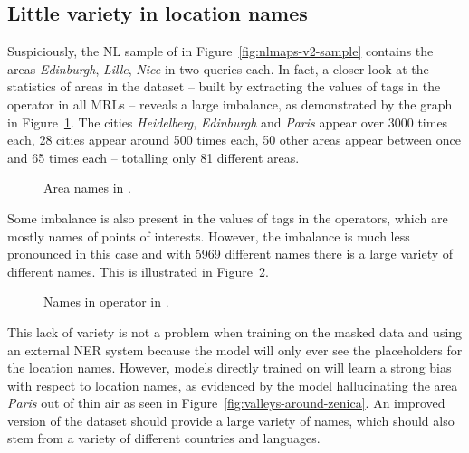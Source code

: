 \subsection{Little variety in location names}
\label{sec:little-location-variety}

Suspiciously, the NL sample of \nlmapstwo{} in Figure~\ref{fig:nlmaps-v2-sample}
contains the areas \emph{Edinburgh}, \emph{Lille}, \emph{Nice} in two queries
each. In fact, a closer look at the statistics of areas in the dataset – built
by extracting the values of  tags in the  operator in
all \nlmapstwo{} MRLs – reveals a large imbalance, as demonstrated by the graph
in Figure~\ref{fig:nlmaps-v2-areas}. The cities \emph{Heidelberg},
\emph{Edinburgh} and \emph{Paris} appear over \num{3000} times each, \num{28}
cities appear around \num{500} times each, \num{50} other areas appear between
once and \num{65} times each – totalling only \num{81} different areas.

\begin{figure}[h]
  \centering
  \resizebox{\textwidth}{!}{}
  \caption[Area names in \nlmapstwo{}]{Area names in \nlmapstwo{}.}
  \label{fig:nlmaps-v2-areas}
\end{figure}

Some imbalance is also present in the values of  tags in the
 operators, which are mostly names of points of interests. However, the
imbalance is much less pronounced in this case and with \num{5969} different
names there is a large variety of different names. This is illustrated in
Figure~\ref{fig:nlmaps-v2-nwrs}.

\begin{figure}[h]
  \centering
  \resizebox{\textwidth}{!}{}
  \caption[ names in \nlmapstwo{}]{Names in  operator in
    \nlmapstwo{}.}
  \label{fig:nlmaps-v2-nwrs}
\end{figure}

This lack of variety is not a problem when training on the masked data and using
an external NER system because the model will only ever see the placeholders for
the location names. However, models directly trained on \nlmapstwo{} will learn
a strong bias with respect to location names, as evidenced by the model
hallucinating the area \emph{Paris} out of thin air as seen in
Figure~\ref{fig:valleys-around-zenica}. An improved version of the dataset
should provide a large variety of names, which should also stem from a variety
of different countries and languages.


